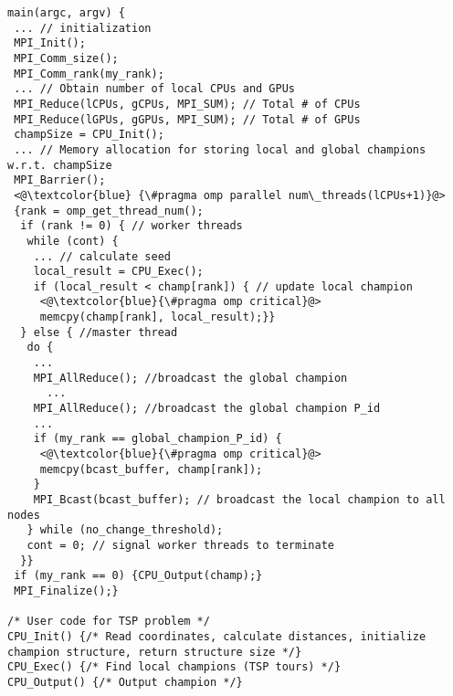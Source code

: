 \begin{frame}{}
  \lstset{language=C}
 \begin{lstlisting}[caption={ILCS Overview},label={lst:ilcs}]
main(argc, argv) {
 ... // initialization
 MPI_Init();
 MPI_Comm_size();
 MPI_Comm_rank(my_rank);
 ... // Obtain number of local CPUs and GPUs
 MPI_Reduce(lCPUs, gCPUs, MPI_SUM); // Total # of CPUs
 MPI_Reduce(lGPUs, gGPUs, MPI_SUM); // Total # of GPUs
 champSize = CPU_Init();
 ... // Memory allocation for storing local and global champions w.r.t. champSize
 MPI_Barrier();
 <@\textcolor{blue} {\#pragma omp parallel num\_threads(lCPUs+1)}@>
 {rank = omp_get_thread_num();
  if (rank != 0) { // worker threads
   while (cont) {
    ... // calculate seed
    local_result = CPU_Exec();
    if (local_result < champ[rank]) { // update local champion
     <@\textcolor{blue}{\#pragma omp critical}@>
     memcpy(champ[rank], local_result);}}
  } else { //master thread
   do {
    ...
    MPI_AllReduce(); //broadcast the global champion 
	  ...
    MPI_AllReduce(); //broadcast the global champion P_id
    ...
    if (my_rank == global_champion_P_id) {
     <@\textcolor{blue}{\#pragma omp critical}@>
     memcpy(bcast_buffer, champ[rank]);
    }
    MPI_Bcast(bcast_buffer); // broadcast the local champion to all nodes
   } while (no_change_threshold);
   cont = 0; // signal worker threads to terminate
  }}
 if (my_rank == 0) {CPU_Output(champ);}
 MPI_Finalize();}

/* User code for TSP problem */
CPU_Init() {/* Read coordinates, calculate distances, initialize champion structure, return structure size */}
CPU_Exec() {/* Find local champions (TSP tours) */}
CPU_Output() {/* Output champion */}
\end{lstlisting}
\end{frame}
